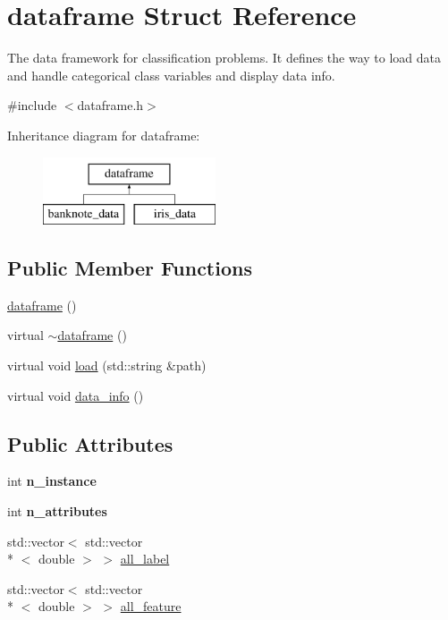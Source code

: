 \hypertarget{structdataframe}{\section{dataframe Struct Reference}
\label{structdataframe}
}


The data framework for classification problems. It defines the way to load data and handle categorical class variables and display data info.  




{\ttfamily \#include $<$dataframe.\-h$>$}

Inheritance diagram for dataframe\-:\begin{figure}[H]
\begin{center}
\leavevmode
\includegraphics[height=2.000000cm]{structdataframe}
\end{center}
\end{figure}
\subsection*{Public Member Functions}
\begin{DoxyCompactItemize}
\item 
\hyperlink{structdataframe_a4ddfcbd8b4c6a38a5439811e9a8621e8}{dataframe} ()
\item 
virtual \hyperlink{structdataframe_a3e5a7cfc9408d92321f6ba8ea7635178}{$\sim$dataframe} ()
\item 
virtual void \hyperlink{structdataframe_ae108c949f6f3f89c7ed000e90c3a2e64}{load} (std\-::string \&path)
\item 
virtual void \hyperlink{structdataframe_ac71cab6be91e8cb90d8efa88e6866b83}{data\-\_\-info} ()
\end{DoxyCompactItemize}
\subsection*{Public Attributes}
\begin{DoxyCompactItemize}
\item 
\hypertarget{structdataframe_ad3f184a47c59346533a0194b6c06e52c}{int {\bfseries n\-\_\-instance}}\label{structdataframe_ad3f184a47c59346533a0194b6c06e52c}

\item 
\hypertarget{structdataframe_a5a79b2e10c24de75717c87c2f74f6809}{int {\bfseries n\-\_\-attributes}}\label{structdataframe_a5a79b2e10c24de75717c87c2f74f6809}

\item 
std\-::vector$<$ std\-::vector\\*
$<$ double $>$ $>$ \hyperlink{structdataframe_af6f4f8d2ada43ba75b9b2a726d8dbf91}{all\-\_\-label}
\item 
std\-::vector$<$ std\-::vector\\*
$<$ double $>$ $>$ \hyperlink{structdataframe_a8d76966d6bccec17ca513628319c8527}{all\-\_\-feature}
\end{DoxyCompactItemize}


